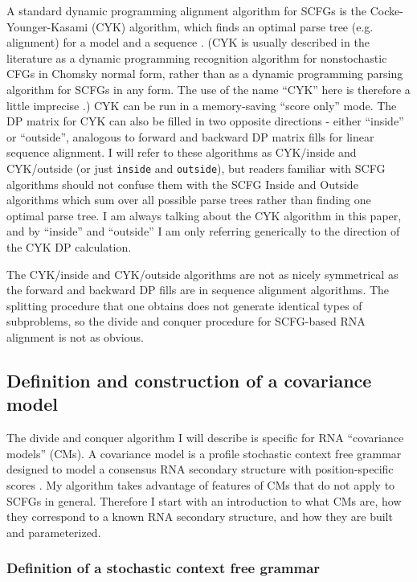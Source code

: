\documentclass[11pt]{article}
\begin{document}
A standard dynamic programming alignment algorithm for SCFGs is the
Cocke-Younger-Kasami (CYK) algorithm, which finds an optimal parse
tree (e.g. alignment) for a model and a sequence
\cite{Kasami65,Younger67,HopcroftUllman79,Durbin98}. (CYK is usually
described in the literature as a dynamic programming recognition
algorithm for nonstochastic CFGs in Chomsky normal form, rather than
as a dynamic programming parsing algorithm for SCFGs in any form. The
use of the name ``CYK'' here is therefore a little imprecise
\cite{Durbin98}.)  CYK can be run in a memory-saving ``score only''
mode. The DP matrix for CYK can also be filled in two opposite
directions - either ``inside'' or ``outside'', analogous to forward
and backward DP matrix fills for linear sequence alignment.  I will
refer to these algorithms as CYK/inside and CYK/outside (or just
\texttt{inside} and \texttt{outside}), but readers familiar with SCFG
algorithms should not confuse them with the SCFG Inside and Outside
algorithms \cite{Lari90,Lari91} which sum over all possible parse
trees rather than finding one optimal parse tree. I am always talking
about the CYK algorithm in this paper, and by ``inside'' and
``outside'' I am only referring generically to the direction of the
CYK DP calculation.

The CYK/inside and CYK/outside algorithms are not as nicely
symmetrical as the forward and backward DP fills are in sequence
alignment algorithms. The splitting procedure that one obtains does
not generate identical types of subproblems, so the divide and conquer
procedure for SCFG-based RNA alignment is not as obvious.

\subsection{Definition and construction of a covariance model}

The divide and conquer algorithm I will describe is specific for RNA
``covariance models'' (CMs). A covariance model is a profile
stochastic context free grammar designed to model a consensus RNA
secondary structure with position-specific scores
\cite{Eddy94,Durbin98}. My algorithm takes advantage of features of
CMs that do not apply to SCFGs in general.  Therefore I start with an
introduction to what CMs are, how they correspond to a known RNA
secondary structure, and how they are built and parameterized.

\subsubsection{Definition of a stochastic context free grammar}
\end{document}
